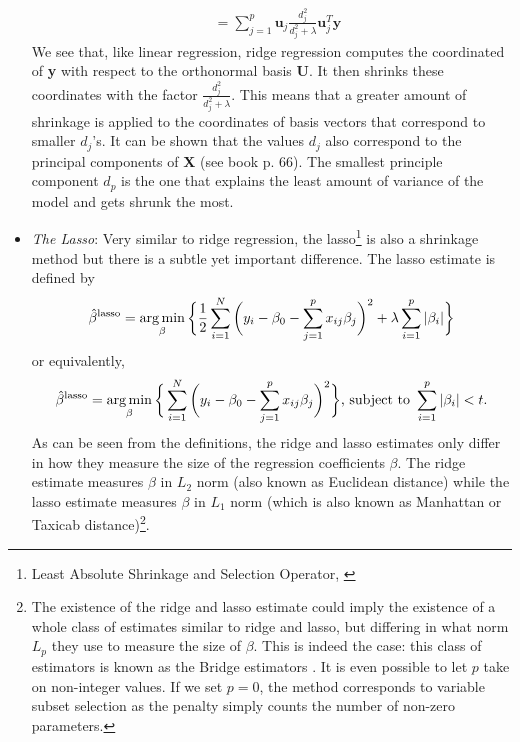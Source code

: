 \begin{itemize}
\begin{align*}
        & = \sum_{j=1}^p \textbf{u}_j\frac{d_j^2}{d_j^2 + \lambda}\textbf{u}_j^T\textbf{y}
    \end{align*}
    We see that, like linear regression, ridge regression computes the coordinated of \textbf{y} with respect to the orthonormal basis \textbf{U}. It then shrinks these coordinates with the factor $\frac{d_j^2}{d_j^2 + \lambda}$. This means that a greater amount of shrinkage is applied to the coordinates of basis vectors that correspond to smaller $d_j$'s. It can be shown that the values $d_j$ also correspond to the principal components of \textbf{X} (see book p. 66). The smallest principle component $d_p$ is the one that explains the least amount of variance of the model and gets shrunk the most.
    
    \item \textit{The Lasso}: Very similar to ridge regression, the lasso\footnote{Least Absolute Shrinkage and Selection Operator, \cite{Kas2018}} is also a shrinkage method but there is a subtle yet important difference. The lasso estimate is defined by \begin{equation}\label{eq:lassoEstimate}
        \hat{\beta}{}^{\textrm{lasso}} = \operatorname*{arg\,min}_{\beta}\bigg\{\frac{1}{2}\sum_{i=1}^N \bigg(y_i - \beta_0 - \sum_{j=1}^p x_{ij}\beta_j\bigg)^2 + \lambda \sum_{i=1}^p |\beta_i|\bigg\}
    \end{equation}
    or equivalently,
    \begin{equation*}
        \begin{aligned}
        \hat{\beta}{}^{\text{lasso}} = \argmin_{\beta}\bigg\{\sum_{i=1}^N \bigg(y_i - \beta_0 - \sum_{j=1}^p x_{ij}\beta_j\bigg)^2\bigg\} \newline \text{, subject to } \sum_{i=1}^p |\beta_i| < t.
    \end{aligned}
    \end{equation*}
    As can be seen from the definitions, the ridge and lasso estimates only differ in how they measure the size of the regression coefficients $\beta$. The ridge estimate measures $\beta$ in $L_2$ norm (also known as Euclidean distance) while the lasso estimate measures $\beta$ in $L_1$ norm (which is also known as Manhattan or Taxicab distance)\footnote{The existence of the ridge and lasso estimate could imply the existence of a whole class of estimates similar to ridge and lasso, but differing in what norm $L_p$ they use to measure the size of $\beta$. This is indeed the case: this class of estimators is known as the Bridge estimators \cite{WWM2020}. It is even possible to let $p$ take on non-integer values. If we set $p=0$, the method corresponds to variable subset selection as the penalty simply counts the number of non-zero parameters.}.
\end{itemize}

